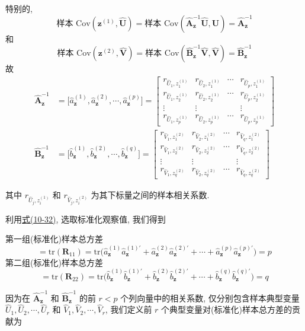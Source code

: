 特别的,
\[
\text{样本 }\mathrm{Cov}(\mathbf{z}^{(1)},\hat{\mathbf{U}})=\text{样本 }\mathrm{Cov}(\hat{\mathbf{A}}_{\mathbf{z}}^{-1}\hat{\mathbf{U}},\hat{\mathbf{U}})=\hat{\mathbf{A}}_{\mathbf{z}}^{-1}
\]
和
\[
\text{样本 }\mathrm{Cov}(\mathbf{z}^{(2)},\hat{\mathbf{V}})=\text{样本 }\mathrm{Cov}(\hat{\mathbf{B}}_{\mathbf{z}}^{-1}\hat{\mathbf{V}},\hat{\mathbf{V}})=\hat{\mathbf{B}}_{\mathbf{z}}^{-1}
\]
故
\label{eq:10-35}
\begin{equation}
\begin{aligned}
\hat{\mathbf{A}}_{\mathbf{z}}^{-1}&=\big[\hat{a}_{\mathbf{z}}^{(1)},\hat{a}_{\mathbf{z}}^{(2)},\cdots,\hat{a}_{\mathbf{z}}^{(p)}\big]=\begin{bmatrix}r_{\hat{U}_1,z_1^{(1)}}&r_{\hat{U}_2,z_1^{(1)}}&\cdots&r_{\hat{U}_p,z_1^{(1)}}\\
r_{\hat{U}_1,z_2^{(1)}}&r_{\hat{U}_2,z_2^{(1)}}&\cdots&r_{\hat{U}_p,z_2^{(1)}}\\
\vdots&\vdots&&\vdots\\
r_{\hat{U}_1,z_p^{(1)}}&r_{\hat{U}_2,z_p^{(1)}}&\cdots&r_{\hat{U}_p,z_p^{(1)}}\end{bmatrix}\\[8pt]
\hat{\mathbf{B}}_{\mathbf{z}}^{-1}&=\big[\hat{b}_{\mathbf{z}}^{(1)},\hat{b}_{\mathbf{z}}^{(2)},\cdots,\hat{b}_{\mathbf{z}}^{(q)}\big]=\begin{bmatrix}r_{\hat{V}_1,z_1^{(2)}}&r_{\hat{V}_2,z_1^{(2)}}&\cdots&r_{\hat{V}_q,z_1^{(2)}}\\
r_{\hat{V}_1,z_2^{(2)}}&r_{\hat{V}_2,z_2^{(2)}}&\cdots&r_{\hat{V}_q,z_2^{(2)}}\\
\vdots&\vdots&&\vdots\\
r_{\hat{V}_1,z_q^{(2)}}&r_{\hat{V}_2,z_q^{(2)}}&\cdots&r_{\hat{V}_q,z_q^{(2)}}\end{bmatrix}
\end{aligned}
\tag{10-35}
\end{equation}

其中 $r_{\hat{U}_j,z_i^{(1)}}$ 和 $r_{\hat{V}_j,z_i^{(2)}}$ 为其下标量之间的样本相关系数.

利用\hyperref[eq:10-32]{式(10-32)}, 选取标准化观察值, 我们得到

第一组(标准化)样本总方差
\label{eq:10-36a}
\begin{equation}
=\mathrm{tr}(\mathbf{R}_{11})=\mathrm{tr}\big(\hat{a}_{\mathbf{z}}^{(1)}\hat{a}_{\mathbf{z}}^{(1)'}+\hat{a}_{\mathbf{z}}^{(2)}\hat{a}_{\mathbf{z}}^{(2)'}+\cdots+\hat{a}_{\mathbf{z}}^{(p)}\hat{a}_{\mathbf{z}}^{(p)'}\big)=p
\tag{10-36a}
\end{equation}
第二组(标准化)样本总方差
\label{eq:10-36b}
\begin{equation}
=\mathrm{tr}(\mathbf{R}_{22})=\mathrm{tr}\big(\hat{b}_{\mathbf{z}}^{(1)}\hat{b}_{\mathbf{z}}^{(1)'}+\hat{b}_{\mathbf{z}}^{(2)}\hat{b}_{\mathbf{z}}^{(2)'}+\cdots+\hat{b}_{\mathbf{z}}^{(q)}\hat{b}_{\mathbf{z}}^{(q)'}\big)=q
\tag{10-36b}
\end{equation}

因为在 $\hat{\mathbf{A}}_{\mathbf{z}}^{-1}$ 和 $\hat{\mathbf{B}}_{\mathbf{z}}^{-1}$ 的前 $r<p$ 个列向量中的相关系数, 仅分别包含样本典型变量 $\hat{U}_1,\hat{U}_2,\cdots,\hat{U}_r$ 和 $\hat{V}_1,\hat{V}_2,\cdots,\hat{V}_r$, 我们定义前 $r$ 个典型变量对(标准化)样本总方差的贡献为
